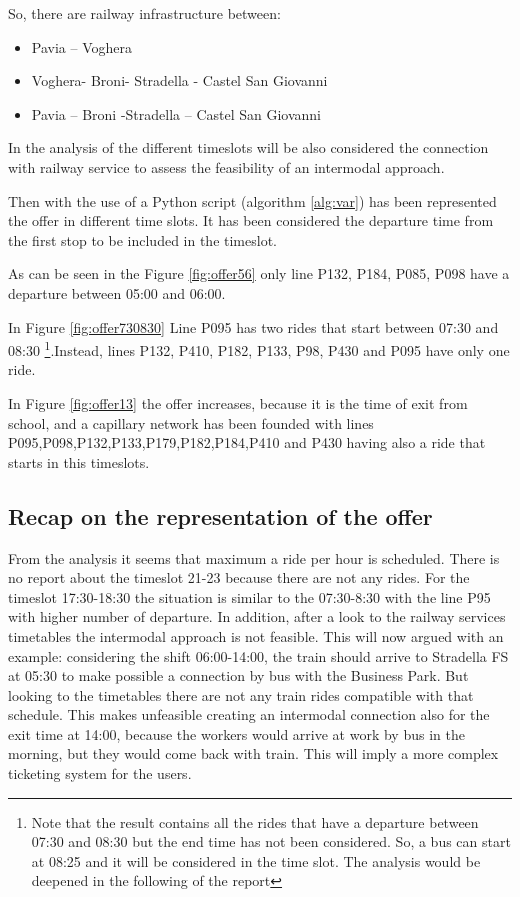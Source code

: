 So, there are railway infrastructure between:

\begin{itemize}
    \item Pavia – Voghera
    \item Voghera- Broni- Stradella - Castel San Giovanni
    \item Pavia – Broni -Stradella – Castel San Giovanni
\end{itemize}
In the analysis of the different timeslots will be also considered the connection with railway service to assess the feasibility of an intermodal approach.

Then with the use of a Python script (algorithm \ref{alg:var}) has been represented the offer in different time slots. It has been considered the departure time from the first stop to be included in the timeslot.

As can be seen in the Figure \ref{fig:offer56} only line P132, P184, P085, P098 have a departure between 05:00 and 06:00.

In Figure \ref{fig:offer730830} Line P095 has two rides that  start between 07:30 and 08:30 \footnote{Note that the result contains all the rides that have a departure between 07:30 and 08:30 but the end time has not been considered. So, a bus can start at 08:25 and it will be considered in the time slot. The analysis would be deepened in the following of the report}.Instead, lines P132, P410, P182, P133, P98, P430 and P095 have only one ride.

In Figure \ref{fig:offer13} the offer increases, because it is the time of exit from school, and a capillary network has been founded with lines P095,P098,P132,P133,P179,P182,P184,P410 and P430 having also a ride that starts in this timeslots.
\subsection{Recap on the representation of the offer}
From the analysis it seems that maximum a ride per hour is scheduled. There is no report about the timeslot 21-23 because there are not any rides. For the timeslot 17:30-18:30 the situation is similar to the 07:30-8:30 with the line P95 with higher number of departure.
In addition, after a look to the railway services timetables the intermodal approach is not feasible. This will now argued with an example: considering the shift 06:00-14:00, the train should arrive to Stradella FS at 05:30 to make possible a connection by bus with the Business Park. But looking to the timetables there are not any train rides compatible with that schedule. This makes unfeasible creating an intermodal connection also for the exit time at 14:00, because the workers would arrive at work by bus in the morning, but they would come back with train. This will imply a more complex ticketing system for the users.
 
